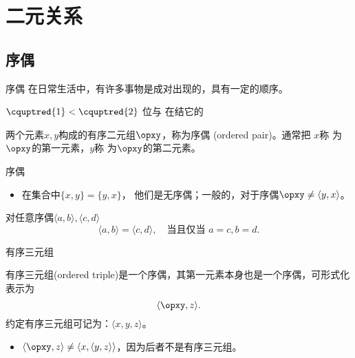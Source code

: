 \section{二元关系}
\subsection{序偶}

\begin{frame}{序偶}
\pause
\vspace{-2ex}
\finger 在日常生活中，有许多事物是成对出现的，具有一定的顺序。
\pause
\begin{center}
$\cquptred{1}<\cquptred{2}$\qquad \pause
{}位与\qquad \pause
{}在结它的
\end{center}\pause


\begin{defi}
  两个元素$x, y$构成的有序二元组$\opxy$，称为\alert{序偶 (ordered pair)}。通常把
  $x$称 为$\opxy$的\alert{第一元素}，$y$称 为$\opxy$的\alert{第二元素}。
\end{defi}

\end{frame}
\begin{frame}{序偶}
\pause
\begin{itemize}
  \item 在集合中$\{x,y\}=\{y,x\}$， 他们是无序偶；一般的，对于序偶$\opxy\neq\langle y,x\rangle $。
\end{itemize}\pause
\vspace{2ex}
\begin{thm}
  对任意序偶$\langle a,b\rangle,\langle c,d\rangle$
  \vspace{-1ex}\[\langle a,b\rangle=\langle c,d\rangle,\quad\mbox{当且仅当~} a=c,b=d.\]
\end{thm}


\end{frame}


\begin{frame}{有序三元组}
\pause
\begin{defi}
  \alert{有序三元组(ordered triple)}是一个序偶，其第一元素本身也是一个序偶，可形式化表示为$$\langle \opxy,z\rangle.$$约定有序三元组可记为：$\langle x,y,z\rangle$。
\end{defi}\pause
\vspace{2ex}
\begin{itemize}
  \item $\langle \opxy,z\rangle\neq\langle x,\langle y,z\rangle\rangle$，因为后者不是有序三元组。
\end{itemize}

\end{frame}

